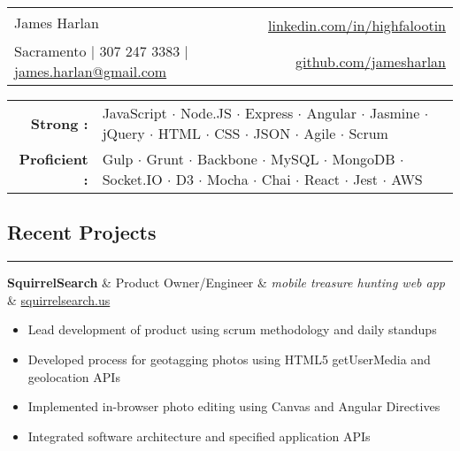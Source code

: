 \documentclass[10pt]{article}
\newenvironment{roles}
{ \vspace{0.25em}
  \begin{itemize}
    \setlength{\itemsep}{-0.75em}
    \setlength{\parskip}{0em}
    \setlength{\parsep}{-0.5em}
    \setlength{\partopsep}{0pt}
    \setlength{\topsep}{0pt}
}
{ \end{itemize}
  \vspace{0.5em}
}
\newenvironment{org}
{ \noindent
  \tabularx{\textwidth}{p{5cm} p{4cm} r Y }
}
{
  \endtabularx
  \vspace{-0.5em}
}
\newcommand*\minitem{
  \vspace{-0.25em}
  \item[$\cdot$]
  \vspace{-0.25em}
}
\newcommand*\nvssec{
  \vspace{-1.5em}
  \subsection*
}
\begin{document}
\begin{center}
\begin{tabularx}{1.0\textwidth}{l X r}
  \multirow{2}{*}{\Huge{James Harlan}}& &  \\
   & & \href{https://www.linkedin.com/in/highfalootin}{\color{blue}linkedin.com/in/highfalootin} \\
  Sacramento $\vert$ 307 247 3383 $\vert$ \href{mailto:james.harlan@gmail.com}{\color{blue}james.harlan@gmail.com} & & \href{http://github.com/jamesharlan}{\color{blue}github.com/jamesharlan}
\end{tabularx}

\vspace{2mm}

\begin{tabularx}{\textwidth}{r X}
  \textbf{Strong : } & JavaScript $\cdot$ Node.JS $\cdot$ Express $\cdot$ Angular $\cdot$ Jasmine $\cdot$ jQuery $\cdot$ HTML $\cdot$ CSS $\cdot$ JSON $\cdot$  Agile $\cdot$ Scrum \\
  \textbf{Proficient : } & Gulp $\cdot$ Grunt $\cdot$ Backbone $\cdot$ MySQL $\cdot$ MongoDB $\cdot$ Socket.IO $\cdot$ D3 $\cdot$ Mocha $\cdot$ Chai $\cdot$ React $\cdot$ Jest $\cdot$ AWS \
\end{tabularx}

\end{center}
\vspace{-0.5em}
\nvssec{Recent Projects}
\vspace{-1.5em}
\noindent\rule{\textwidth}{0.5pt}

\begin{org}
  \textbf{SquirrelSearch} & Product Owner/Engineer & \emph{mobile treasure hunting web app} & \href{http://squirrelsearch.us}{\color{blue}squirrelsearch.us} \\
\end{org}
\begin{roles}
  \minitem Lead development of product using scrum methodology and daily standups\\
  \minitem Developed process for geotagging photos using HTML5 getUserMedia and geolocation APIs \\
  \minitem Implemented in-browser photo editing using Canvas and Angular Directives\\
  \minitem Integrated software architecture and specified application APIs
\end{roles}
\vspace{0.25em}
\end{document}
